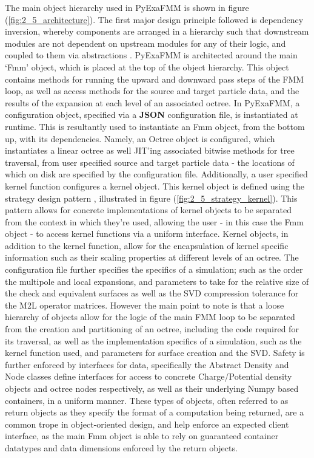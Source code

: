 The main object hierarchy used in \gls{PyExaFMM} is shown in figure
(\ref{fig:2_5_architecture}). The first major design principle followed is dependency
inversion, whereby components are arranged in a hierarchy such that downstream
modules are not dependent on upstream modules for any of their logic, and coupled
to them via abstractions \cite{Gamma:1994:Addison}. \gls{PyExaFMM} is architected
around the main `Fmm' object, which is placed at the top of the object hierarchy.
This object contains methods for running the upward and downward pass steps of the
\gls{FMM} loop, as well as access methods for the source and target particle data,
and the results of the expansion at each level of an associated octree. In \gls{PyExaFMM}, a configuration
object, specified via a \textbf{\gls{JSON}} configuration file, is instantiated
at runtime. This is resultantly used to instantiate an Fmm object, from the bottom
up, with its dependencies. Namely, an Octree object is configured, which instantiates
a linear octree as well \gls{JIT}'ing associated bitwise methods for tree traversal, from
user specified source and target particle data - the locations of which on disk are
specified by the configuration file. Additionally, a user specified kernel function
configures a kernel object. This kernel object is defined using the strategy design pattern
\cite{Gamma:1994:Addison}, illustrated in figure (\ref{fig:2_5_strategy_kernel}).
This pattern allows for concrete implementations of kernel objects to be separated
from the context in which they're used, allowing the user - in this case the
Fmm object - to access kernel functions via a uniform interface. Kernel
objects, in addition to the kernel function, allow for the encapsulation of
kernel specific information such as their scaling properties at different levels
of an octree. The configuration file further specifies the specifics of a simulation; such as the order the
multipole and local expansions, and parameters to take for the relative size of
the check and equivalent surfaces as well as the SVD compression tolerance for the
M2L operator matrices. However the main point to note is that a loose hierarchy
of objects allow for the logic of the main \gls{FMM} loop to be separated from
the creation and partitioning of an octree, including the code required for
its traversal, as well as the implementation specifics of a simulation, such
as the kernel function used, and parameters for surface creation and the SVD.
Safety is further enforced by interfaces for data, specifically the Abstract
Density and Node classes define interfaces for access to concrete Charge/Potential density
objects and octree nodes respectively, as well as their underlying Numpy based containers,
in a uniform manner. These types of objects, often referred to as return objects
as they specify the format of a computation being returned, are a common trope in
object-oriented design, and help enforce an expected client
interface, as the main Fmm object is able to rely on guaranteed container
datatypes and data dimensions enforced by the return objects.

